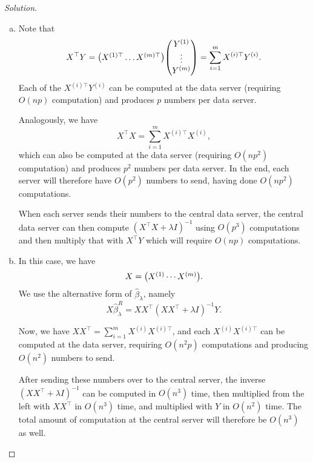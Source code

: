 \documentclass{article}
\theoremstyle{plain}
\theoremstyle{remark}
\newenvironment{solution}{\begin{proof}[Solution]\renewcommand\qedsymbol{}}{\end{proof}}
\newcommand{\T}{^\top} %
\begin{document}
\begin{solution}
    \begin{enumerate}[(a)]
        \item Note that
        \[
        X\T Y = \mqty( X^{(1)\top} \dotsc X^{(m)\top}) \mqty( Y^{(1)}\\\vdots\\Y^{(m)}) = \sum_{i=1}^m X^{(i)\top} Y^{(i)}. 
        \]
        Each of the $X^{(i)\top} Y^{(i)}$ can be computed at the data server (requiring $O(np)$ computation) and produces $p$ numbers per data server. 
        
        Analogously, we have
        \[
        X\T X = \sum_{i=1}^m X^{(i)\top} X^{(i)},
        \]
        which can also be computed at the data server (requiring $O(np^2)$ computation) and produces $p^2$ numbers per data server. In the end, each server will therefore have $O(p^2)$ numbers to send, having done $O(np^2)$ computations. 
        
        When each server sends their numbers to the central data server, the central data server can then compute $(X\T X + \lambda I)^{-1}$ using $O(p^3)$ computations and then multiply that with $X\T Y$ which will require $O(np)$ computations. 
        
        \item In this case, we have 
        \[
        X = \mqty( X^{(1)} \dotsb X^{(m)} ). 
        \]
        We use the alternative form of  $\hat\beta_\lambda$, namely
        \[
        X \hat\beta_\lambda^R = XX\T (XX\T + \lambda I)^{-1} Y.
        \]
        
        Now, we have $XX\T = \sum_{i=1}^m X^{(i)} X^{(i)\top}$, and each $X^{(i)} X^{(i)\top}$ can be computed at the data server, requiring $O(n^2 p)$ computations and producing $O(n^2)$ numbers to send.  
        
        After sending these numbers over to the central server, the inverse $(XX\T + \lambda I)^{-1}$ can be computed in $O(n^3)$ time, then multiplied from the left with $XX\T$ in $O(n^3)$ time, and multiplied with $Y$ in $O(n^2)$ time. The total amount of computation at the central server will therefore be $O(n^3)$ as well. 
    \end{enumerate}
\end{solution}
\end{document}
